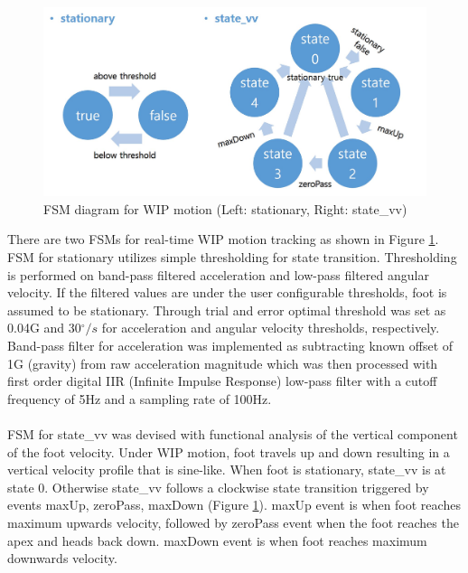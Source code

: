 \begin{figure}[th]
\captionsetup{justification=raggedright,singlelinecheck=false}
\centering
\includegraphics[width=\textwidth,height=\textheight,keepaspectratio]{Figures/WIP_FSM.jpg}
\decoRule
\caption[FSM diagram for WIP motion]{FSM diagram for WIP motion (Left: stationary, Right: state\_vv)}
\label{fig:WIPFSM}
\end{figure}
\noindent
There are two FSMs for real-time WIP motion tracking as shown in Figure \ref{fig:WIPFSM}. FSM for stationary utilizes simple thresholding for state transition. Thresholding is performed on band-pass filtered acceleration and low-pass filtered angular velocity. If the filtered values are under the user configurable thresholds, foot is assumed to be stationary. Through trial and error optimal threshold was set as 0.04G and 30$^{\circ}/s$ for acceleration and angular velocity thresholds, respectively. Band-pass filter for acceleration was implemented as subtracting known offset of 1G (gravity) from raw acceleration magnitude which was then processed with first order digital IIR (Infinite Impulse Response) low-pass filter with a cutoff frequency of 5Hz and a sampling rate of 100Hz.
\\\\
FSM for state\_vv was devised with functional analysis of the vertical component of the foot velocity. Under WIP motion, foot travels up and down resulting in a vertical velocity profile that is sine-like. When foot is stationary, state\_vv is at state 0. Otherwise state\_vv follows a clockwise state transition triggered by events maxUp, zeroPass, maxDown (Figure \ref{fig:WIPFSM}). maxUp event is when foot reaches maximum upwards velocity, followed by zeroPass event when the foot reaches the apex  and heads back down. maxDown event is when foot reaches maximum downwards velocity.

